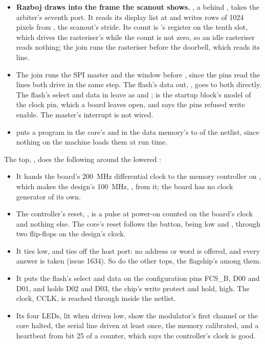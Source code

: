 \begin{itemize}
the last one's engine has finished, so the two never offer at once
and the nest costs neither a turn; the host checks that their busy
lines are never high together.  and 
hold the directions they never use.
\item \textbf{Razboj draws into the frame the scanout shows.}
, a  behind , takes the arbiter's seventh
port. It reads its display list at  and writes
rows of 1024 pixels from , the scanout's stride. Its
count is 's register on the tenth slot, which drives the
rasteriser's  while the count is not zero, so an idle
rasteriser reads nothing; the join runs the rasteriser before the
doorbell, which reads its  line.
\item The join runs the SPI master and the window before
, since the pins read the lines both drive in the same
step. The flash's data out, , goes to both directly. The
flash's select and data in leave as  and
;  is the startup block's model of the
clock pin, which a board leaves open, and  says the
pins refused write enable. The master's interrupt is not wired.
\item {} puts a program in the core's
 and in the data memory's  to  of
the netlist, since nothing on the machine loads them at run time.
\end{itemize}

The top, , does the following around the
lowered :

\begin{itemize}
\item It hands the board's 200~MHz differential clock to the memory
controller on , which makes the design's 100~MHz,
, from it; the board has no clock generator of its own.
\item The controller's reset, , is a pulse at power-on
counted on the board's clock and nothing else. The core's reset
follows the button,  being low and , through
two flip-flops on the design's clock.
\item It ties  low, and ties off the host port: no address
or word is offered, and every answer is taken (issue 1634). So do the
other tops, the flagship's among them.
\item It puts the flash's select and data on the configuration pins
FCS\_B, D00 and D01, and holds D02 and D03, the chip's write protect
and hold, high. The clock, CCLK, is reached through 
inside the netlist.
\item Its four LEDs, lit when driven low, show the modulator's first
channel or the core halted, the serial line driven at least once, the
memory calibrated, and a heartbeat from bit 25 of a counter, which
says the controller's clock is good.
\end{itemize}

